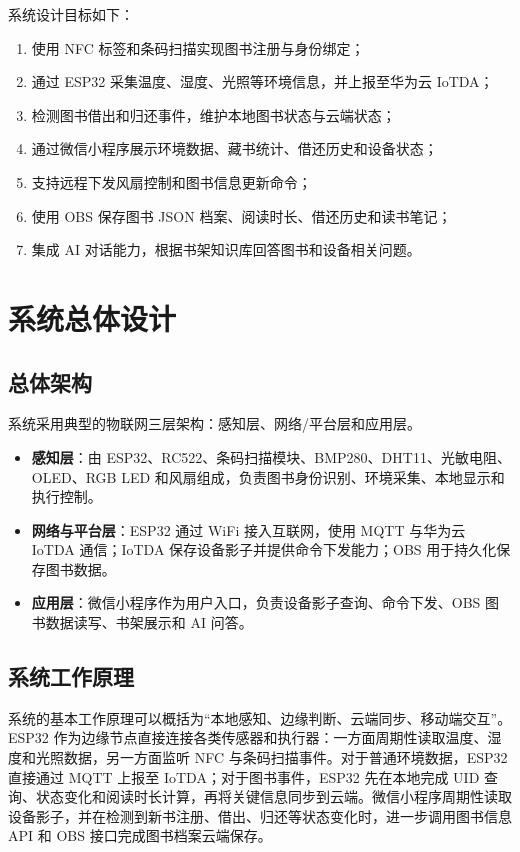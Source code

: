 \documentclass[12pt,hyperref,a4paper,UTF8]{ctexart}
\begin{document}
系统设计目标如下：

\begin{enumerate}
    \item 使用 NFC 标签和条码扫描实现图书注册与身份绑定；
    \item 通过 ESP32 采集温度、湿度、光照等环境信息，并上报至华为云 IoTDA；
    \item 检测图书借出和归还事件，维护本地图书状态与云端状态；
    \item 通过微信小程序展示环境数据、藏书统计、借还历史和设备状态；
    \item 支持远程下发风扇控制和图书信息更新命令；
    \item 使用 OBS 保存图书 JSON 档案、阅读时长、借还历史和读书笔记；
    \item 集成 AI 对话能力，根据书架知识库回答图书和设备相关问题。
\end{enumerate}

\section{系统总体设计}

\subsection{总体架构}

系统采用典型的物联网三层架构：感知层、网络/平台层和应用层。

\begin{itemize}
    \item \textbf{感知层}：由 ESP32、RC522、条码扫描模块、BMP280、DHT11、光敏电阻、OLED、RGB LED 和风扇组成，负责图书身份识别、环境采集、本地显示和执行控制。
    \item \textbf{网络与平台层}：ESP32 通过 WiFi 接入互联网，使用 MQTT 与华为云 IoTDA 通信；IoTDA 保存设备影子并提供命令下发能力；OBS 用于持久化保存图书数据。
    \item \textbf{应用层}：微信小程序作为用户入口，负责设备影子查询、命令下发、OBS 图书数据读写、书架展示和 AI 问答。
\end{itemize}

\subsection{系统工作原理}

系统的基本工作原理可以概括为“本地感知、边缘判断、云端同步、移动端交互”。ESP32 作为边缘节点直接连接各类传感器和执行器：一方面周期性读取温度、湿度和光照数据，另一方面监听 NFC 与条码扫描事件。对于普通环境数据，ESP32 直接通过 MQTT 上报至 IoTDA；对于图书事件，ESP32 先在本地完成 UID 查询、状态变化和阅读时长计算，再将关键信息同步到云端。微信小程序周期性读取设备影子，并在检测到新书注册、借出、归还等状态变化时，进一步调用图书信息 API 和 OBS 接口完成图书档案云端保存。
\end{document}
